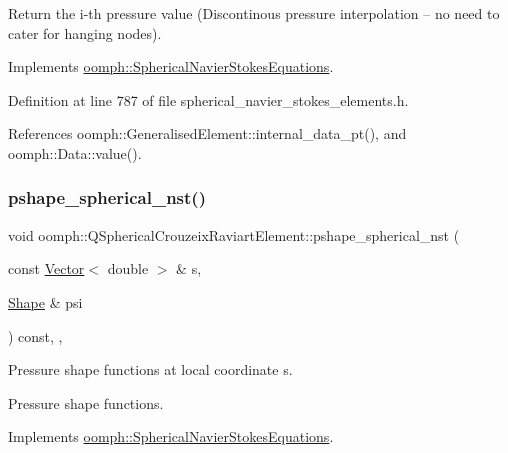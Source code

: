 Return the i-\/th pressure value (Discontinous pressure interpolation -- no need to cater for hanging nodes). 



Implements \hyperlink{classoomph_1_1SphericalNavierStokesEquations_a5b50d547e5a2ad5896dc9612e2bb4176}{oomph\+::\+Spherical\+Navier\+Stokes\+Equations}.



Definition at line 787 of file spherical\+\_\+navier\+\_\+stokes\+\_\+elements.\+h.



References oomph\+::\+Generalised\+Element\+::internal\+\_\+data\+\_\+pt(), and oomph\+::\+Data\+::value().

\mbox{\label{classoomph_1_1QSphericalCrouzeixRaviartElement_ae5be79781d11702c84d9493646153e36}} 
\subsubsection{\texorpdfstring{pshape\+\_\+spherical\+\_\+nst()}{pshape\_spherical\_nst()}\hspace{0.1cm}{\footnotesize\ttfamily [1/2]}}
{\footnotesize\ttfamily void oomph\+::\+Q\+Spherical\+Crouzeix\+Raviart\+Element\+::pshape\+\_\+spherical\+\_\+nst (\begin{DoxyParamCaption}\item[{const \hyperlink{classoomph_1_1Vector}{Vector}$<$ double $>$ \&}]{s,  }\item[{\hyperlink{classoomph_1_1Shape}{Shape} \&}]{psi }\end{DoxyParamCaption}) const\hspace{0.3cm}{\ttfamily [inline]}, {\ttfamily [protected]}, {\ttfamily [virtual]}}



Pressure shape functions at local coordinate s. 

Pressure shape functions. 

Implements \hyperlink{classoomph_1_1SphericalNavierStokesEquations_a17799ec1f3a1d8bbeee1d357bba0a249}{oomph\+::\+Spherical\+Navier\+Stokes\+Equations}.



